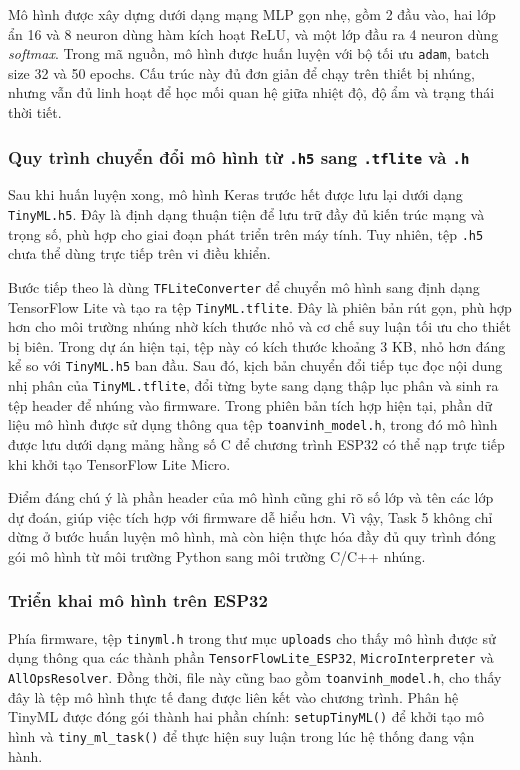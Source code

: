 Mô hình được xây dựng dưới dạng mạng MLP gọn nhẹ, gồm 2 đầu vào, hai lớp ẩn 16 và 8 neuron dùng hàm kích hoạt ReLU, và một lớp đầu ra 4 neuron dùng \textit{softmax}. Trong mã nguồn, mô hình được huấn luyện với bộ tối ưu \texttt{adam}, batch size 32 và 50 epochs. Cấu trúc này đủ đơn giản để chạy trên thiết bị nhúng, nhưng vẫn đủ linh hoạt để học mối quan hệ giữa nhiệt độ, độ ẩm và trạng thái thời tiết.

\subsubsection{Quy trình chuyển đổi mô hình từ \texttt{.h5} sang \texttt{.tflite} và \texttt{.h}}
Sau khi huấn luyện xong, mô hình Keras trước hết được lưu lại dưới dạng \texttt{TinyML.h5}. Đây là định dạng thuận tiện để lưu trữ đầy đủ kiến trúc mạng và trọng số, phù hợp cho giai đoạn phát triển trên máy tính. Tuy nhiên, tệp \texttt{.h5} chưa thể dùng trực tiếp trên vi điều khiển.

Bước tiếp theo là dùng \texttt{TFLiteConverter} để chuyển mô hình sang định dạng TensorFlow Lite và tạo ra tệp \texttt{TinyML.tflite}. Đây là phiên bản rút gọn, phù hợp hơn cho môi trường nhúng nhờ kích thước nhỏ và cơ chế suy luận tối ưu cho thiết bị biên. Trong dự án hiện tại, tệp này có kích thước khoảng 3 KB, nhỏ hơn đáng kể so với \texttt{TinyML.h5} ban đầu. Sau đó, kịch bản chuyển đổi tiếp tục đọc nội dung nhị phân của \texttt{TinyML.tflite}, đổi từng byte sang dạng thập lục phân và sinh ra tệp header để nhúng vào firmware. Trong phiên bản tích hợp hiện tại, phần dữ liệu mô hình được sử dụng thông qua tệp \texttt{toanvinh\_model.h}, trong đó mô hình được lưu dưới dạng mảng hằng số C để chương trình ESP32 có thể nạp trực tiếp khi khởi tạo TensorFlow Lite Micro.

Điểm đáng chú ý là phần header của mô hình cũng ghi rõ số lớp và tên các lớp dự đoán, giúp việc tích hợp với firmware dễ hiểu hơn. Vì vậy, Task 5 không chỉ dừng ở bước huấn luyện mô hình, mà còn hiện thực hóa đầy đủ quy trình đóng gói mô hình từ môi trường Python sang môi trường C/C++ nhúng.

\subsubsection{Triển khai mô hình trên ESP32}
Phía firmware, tệp \texttt{tinyml.h} trong thư mục \texttt{uploads} cho thấy mô hình được sử dụng thông qua các thành phần \texttt{TensorFlowLite\_ESP32}, \texttt{MicroInterpreter} và \texttt{AllOpsResolver}. Đồng thời, file này cũng bao gồm \texttt{toanvinh\_model.h}, cho thấy đây là tệp mô hình thực tế đang được liên kết vào chương trình. Phân hệ TinyML được đóng gói thành hai phần chính: \texttt{setupTinyML()} để khởi tạo mô hình và \texttt{tiny\_ml\_task()} để thực hiện suy luận trong lúc hệ thống đang vận hành.

